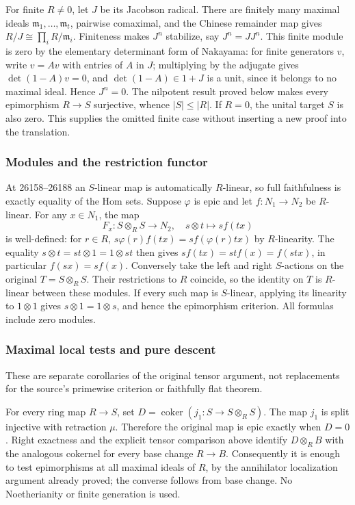 For finite \(R\ne0\), let \(J\) be its Jacobson radical. There are finitely many maximal ideals \(\mathfrak m_1,\ldots,\mathfrak m_t\), pairwise comaximal, and the Chinese remainder map gives \(R/J\cong\prod_iR/\mathfrak m_i\). Finiteness makes \(J^n\) stabilize, say \(J^n=J J^n\). This finite module is zero by the elementary determinant form of Nakayama: for finite generators \(v\), write \(v=A v\) with entries of \(A\) in \(J\); multiplying by the adjugate gives \(\det(1-A)v=0\), and \(\det(1-A)\in1+J\) is a unit, since it belongs to no maximal ideal. Hence \(J^n=0\). The nilpotent result proved below makes every epimorphism \(R\to S\) surjective, whence \(|S|\leq|R|\). If \(R=0\), the unital target \(S\) is also zero. This supplies the omitted finite case without inserting a new proof into the translation.

\subsubsection{Modules and the restriction functor}\label{modules-and-the-restriction-functor}

At 26158--26188 an \(S\)-linear map is automatically \(R\)-linear, so full faithfulness is exactly equality of the Hom sets. Suppose \(\varphi\) is epic and let \(f:N_1\to N_2\) be \(R\)-linear. For any \(x\in N_1\), the map \[
F_x:S\otimes_RS\to N_2,\quad s\otimes t\mapsto s f(tx)
\] is well-defined: for \(r\in R\), \(s\varphi(r)f(tx)=s f(\varphi(r)tx)\) by \(R\)-linearity. The equality \(s\otimes t=st\otimes1=1\otimes st\) then gives \(s f(tx)=st f(x)=f(stx)\), in particular \(f(sx)=s f(x)\). Conversely take the left and right \(S\)-actions on the original \(T=S\otimes_RS\). Their restrictions to \(R\) coincide, so the identity on \(T\) is \(R\)-linear between these modules. If every such map is \(S\)-linear, applying its linearity to \(1\otimes1\) gives \(s\otimes1=1\otimes s\), and hence the epimorphism criterion. All formulas include zero modules.

\subsubsection{Maximal local tests and pure descent}\label{maximal-local-tests-and-pure-descent}

These are separate corollaries of the original tensor argument, not replacements for the source's primewise criterion or faithfully flat theorem.

For every ring map \(R\to S\), set \(D=\operatorname{coker}(j_1:S\to S\otimes_RS)\). The map \(j_1\) is split injective with retraction \(\mu\). Therefore the original map is epic exactly when \(D=0\). Right exactness and the explicit tensor comparison above identify \(D\otimes_RB\) with the analogous cokernel for every base change \(R\to B\). Consequently it is enough to test epimorphisms at all maximal ideals of \(R\), by the annihilator localization argument already proved; the converse follows from base change. No Noetherianity or finite generation is used.


